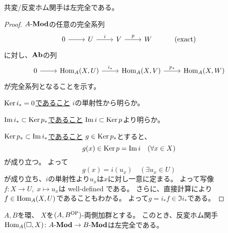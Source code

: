 \documentclass[report]{jlreq}
\begin{document}
共変/反変ホム関手は左完全である。


\begin{proof}

    $A\text{-}\mathbf{Mod}$の任意の完全系列
    \begin{equation}
        \begin{tikzcd}
            0 \ar{r}
                & U \ar{r}{i}
                & V \ar{r}{p}
                & W
                & (\text{exact})
        \end{tikzcd}
    \end{equation}
    に対し、$\mathbf{Ab}$の列
    \begin{equation}
        \begin{tikzcd}
            0 \ar{r} & \Hom_A(X, U) \ar{r}{i_*}
                & \Hom_A(X, V) \ar{r}{p_*}
                & \Hom_A(X, W)
        \end{tikzcd}
    \end{equation}
    が完全系列となることを示す。

    \uline{$\operatorname{\mathrm{Ker}} i_* = 0$であること} \quad
    $i$の単射性から明らか。

    \uline{$\operatorname{\mathrm{Im}} i_* \subset \operatorname{\mathrm{Ker}} p_*$であること} \quad
    $\operatorname{\mathrm{Im}} i \subset \operatorname{\mathrm{Ker}} p$より明らか。

    \uline{$\operatorname{\mathrm{Ker}} p_* \subset \operatorname{\mathrm{Im}} i_*$であること} \quad
    $g \in \operatorname{\mathrm{Ker}} p_*$とすると、
    \begin{equation}
        g(x) \in \operatorname{\mathrm{Ker}} p = \operatorname{\mathrm{Im}} i \quad (\forall x \in X)
    \end{equation}
    が成り立つ。
    よって
    \begin{equation}
        g(x) = i(u_x) \quad (\exists u_x \in U)
    \end{equation}
    が成り立ち、$i$の単射性より$u_x$は$x$に対し一意に定まる。
    よって写像$f \colon X \to U, \; x \mapsto u_x$は well-defined である。
    さらに、直接計算により$f \in \operatorname{Hom}_A(X, U)$であることもわかる。
    よって$g = i_* f \in \Im i_*$である。
\end{proof}

\begin{theorem}[反変ホム関手の左完全性]
    $A, B$を環、
    $X$を$(A, B^{\mathrm{OP}})$-両側加群とする。
    このとき、反変ホム関手
    $\operatorname{Hom}_A(\Box, X) \colon A\text{-}\mathbf{Mod} \to B\text{-}\mathbf{Mod}$は左完全である。
\end{theorem}
\end{document}

